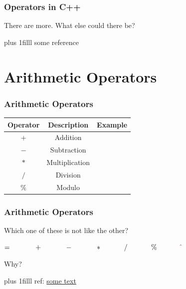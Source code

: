 \documentclass[fleqn]{beamer} %
\newcommand{\sectiontitleI}{Operators in C++} %
\newcommand{\sectiontitleII}{Arithmetic Operators}
\newcommand{\btVFill}{\vskip0pt plus 1filll}
\begin{document}
	\begin{frame} \small
		\frametitle{\sectiontitleI}
	
			There are more. What else could there be?
	
		\btVFill
		\tiny{some reference}	
	\end{frame}


\section{\sectiontitleII}

	\begin{frame}[label=sectionII] \small
		\frametitle{\sectiontitleII}
		
		\renewcommand*{\arraystretch}{1.5}
		\begin{tabular}{c|c|c}
			
			Operator& Description & Example \\ \hline
			$+$&Addition& \\ \hline
			$-$&Subtraction& \\ \hline
			$*$&Multiplication& \\ \hline
			$/$&Division& \\ \hline
			$\%$&Modulo& \\ \hline
	
		\end{tabular}
	
		\end{frame}

	\begin{frame} \small
		\frametitle{\sectiontitleII}
		
		\vspace{5MM}
		
		Which one of these is not like the other?
		
		\vspace{10mm}
		
		{\Large 	$= \hspace{12mm} + \hspace{12mm} - \hspace{12mm} * \hspace{12mm} / \hspace{12mm} \% \hspace{12mm} {\RD \hat{} }$ }
		
		\vspace{10mm}
		
		Why?
		
		\btVFill
		\tiny{ref: \href{some link}{some text}}
	\end{frame}	
\end{document}
